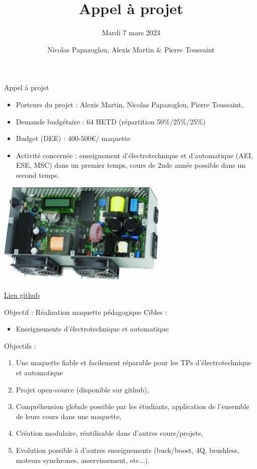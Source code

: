 \documentclass[aspectratio=169]{beamer}
\title{Appel à projet}
\subtitle{Mardi 7 mars 2023}
\date{}
\author[N.P. - A.M. - P.T.]{Nicolas Papazoglou, Alexis Martin \& Pierre Toussaint}
\institute[ENSEA]{ENSEA}
\begin{document}
\begin{frame}
	\titlepage
\end{frame}

\begin{frame}{Appel à projet}
\begin{minipage}{0.49\textwidth}
	\begin{itemize}
		\item Porteurs du projet : Alexis Martin, Nicolas Papazoglou, Pierre Toussaint,
		\item Demande budgétaire : 64 HETD  (répartition 50\%/25\%/25\%)
		\item Budget (DEE) : 400-500\euro / maquette
		\item Activité concernée : enseignement d'électrotechnique et d'automatique (AEI, ESE, MSC) dans un premier temps, cours de 2nde année possible dans un second temps.
	\end{itemize}
\end{minipage}
\begin{minipage}{0.49\textwidth}
	\includegraphics[scale=0.6]{figures/inverter.jpeg} 
\end{minipage}
\center \href{https://github.com/DBXYD/AAP_ENSEA_Inverter}{Lien github}
\end{frame}

\begin{frame}{Objectif : Réalisation maquette pédagogique}
	Cibles : 
	\begin{itemize}
		\item Enseignements d'électrotechnique et automatique
	\end{itemize}
	Objectifs : 
	\begin{enumerate}
		\item Une maquette fiable et facilement réparable pour les TPs d'électrotechnique et automatique
		\item Projet open-source (disponible sur github),
		\item Compréhension globale possible par les étudiants, application de l'ensemble de leurs cours dans une maquette,
		\item Création modulaire, réutilisable dans d'autres cours/projets, 
		\item Evolution possible à d'autres enseignements (buck/boost, 4Q, brushless, moteurs synchrones, asservissement, etc...).
	\end{enumerate}
\end{frame}
\end{document}
